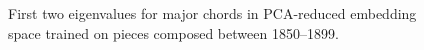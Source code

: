 \begin{figure}
 \centerline{}
 \caption{First two eigenvalues for major chords in PCA-reduced embedding space trained on pieces composed between 1850--1899.}
 \label{fig:1850_majors}
\end{figure}

